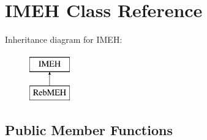 \hypertarget{class_i_m_e_h}{}\section{I\+M\+EH Class Reference}
\label{class_i_m_e_h}
Inheritance diagram for I\+M\+EH\+:\begin{figure}[H]
\begin{center}
\leavevmode
\includegraphics[height=2.000000cm]{class_i_m_e_h}
\end{center}
\end{figure}
\subsection*{Public Member Functions}
